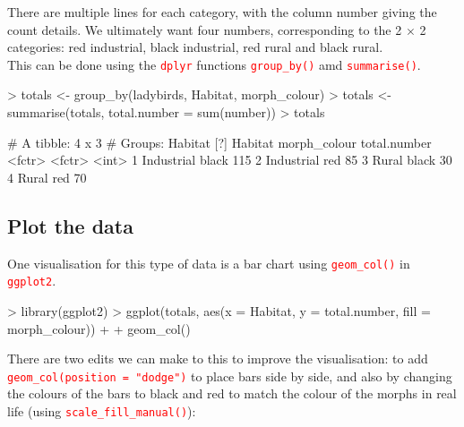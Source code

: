 \documentclass[a4paper,12pt]{article}
\newcommand\code[1]{\textcolor{red}{\texttt{#1}}}
\begin{document}
There are multiple lines for each category, with the column number giving the count details. We ultimately want four numbers, corresponding to the 2 $\times$ 2 categories: red industrial, black industrial, red rural and black rural. \\

This can be done using the \code{dplyr} functions \code{group\_by()} amd \code{summarise()}.

\begin{shaded}
\begin{Schunk}
\begin{Sinput}
> totals <- group_by(ladybirds, Habitat, morph_colour)
> totals <- summarise(totals, total.number = sum(number))
> totals
\end{Sinput}
\begin{Soutput}
# A tibble: 4 x 3
# Groups:   Habitat [?]
     Habitat morph_colour total.number
      <fctr>       <fctr>        <int>
1 Industrial        black          115
2 Industrial          red           85
3      Rural        black           30
4      Rural          red           70
\end{Soutput}
\end{Schunk}
\end{shaded}


\subsection{Plot the data}

One visualisation for this type of data is a bar chart using \code{geom\_col()} in \code{ggplot2}.


\begin{shaded}
\begin{Schunk}
\begin{Sinput}
> library(ggplot2)
> ggplot(totals, aes(x = Habitat, y = total.number, fill = morph_colour)) +
+   geom_col() 
\end{Sinput}
\end{Schunk}
\end{shaded}

There are two edits we can make to this to improve the visualisation: to add \code{geom\_col(position = "dodge")} to place bars side by side, and also by changing the colours of the bars to black and red to match the colour of the morphs in real life (using \code{scale\_fill\_manual()}):
\end{document}
